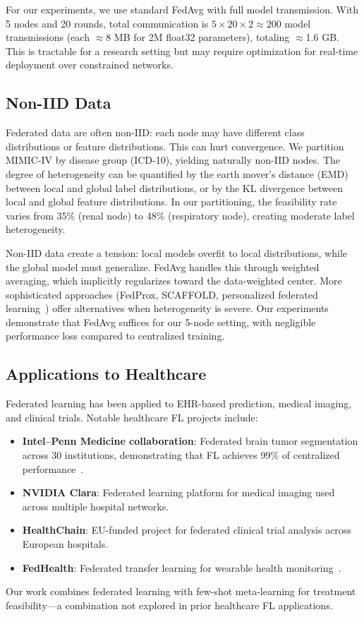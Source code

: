 For our experiments, we use standard FedAvg with full model transmission. With 5 nodes and 20 rounds, total communication is $5 \times 20 \times 2 \approx 200$ model transmissions (each $\approx$8 MB for 2M float32 parameters), totaling $\approx$1.6 GB. This is tractable for a research setting but may require optimization for real-time deployment over constrained networks.

\subsection{Non-IID Data}

Federated data are often non-IID: each node may have different class distributions or feature distributions. This can hurt convergence. We partition MIMIC-IV by disease group (ICD-10), yielding naturally non-IID nodes. The degree of heterogeneity can be quantified by the earth mover's distance (EMD) between local and global label distributions, or by the KL divergence between local and global feature distributions. In our partitioning, the feasibility rate varies from 35\% (renal node) to 48\% (respiratory node), creating moderate label heterogeneity.

Non-IID data create a tension: local models overfit to local distributions, while the global model must generalize. FedAvg handles this through weighted averaging, which implicitly regularizes toward the data-weighted center. More sophisticated approaches (FedProx, SCAFFOLD, personalized federated learning~\cite{smith2017federated}) offer alternatives when heterogeneity is severe. Our experiments demonstrate that FedAvg suffices for our 5-node setting, with negligible performance loss compared to centralized training.

\subsection{Applications to Healthcare}

Federated learning has been applied to EHR-based prediction, medical imaging, and clinical trials. Notable healthcare FL projects include:
\begin{itemize}
\item \textbf{Intel--Penn Medicine collaboration}: Federated brain tumor segmentation across 30 institutions, demonstrating that FL achieves 99\% of centralized performance~\cite{sheller2020federated}.
\item \textbf{NVIDIA Clara}: Federated learning platform for medical imaging used across multiple hospital networks.
\item \textbf{HealthChain}: EU-funded project for federated clinical trial analysis across European hospitals.
\item \textbf{FedHealth}: Federated transfer learning for wearable health monitoring~\cite{chen2020fedhealth}.
\end{itemize}
Our work combines federated learning with few-shot meta-learning for treatment feasibility---a combination not explored in prior healthcare FL applications.

